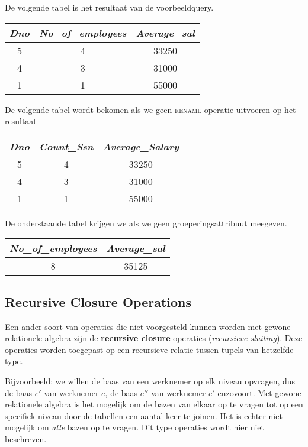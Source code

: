 \noindent De volgende tabel is het resultaat van de voorbeeldquery.
\begin{center}
\begin{tabular}{|c|c|c|}
\hline
\textit{Dno} & \textit{No\_of\_employees} & \textit{Average\_sal} \\ \hline
5 & 4 & 33250\\ \hline
4 & 3 & 31000\\ \hline
1 & 1 & 55000\\
\hline
\end{tabular}
\end{center}
\vspace{4mm}
De volgende tabel wordt bekomen als we geen \textsc{rename}-operatie uitvoeren op het resultaat
\begin{center}
\begin{tabular}{|c|c|c|}
\hline
\textit{Dno} & \textit{Count\_Ssn} & \textit{Average\_Salary} \\ \hline
5 & 4 & 33250\\ \hline
4 & 3 & 31000\\ \hline
1 & 1 & 55000\\
\hline
\end{tabular}
\end{center}
\vspace{4mm}
De onderstaande tabel krijgen we als we geen groeperingsattribuut meegeven.
\begin{center}
\begin{tabular}{|c|c|}
\hline
\textit{No\_of\_employees} & \textit{Average\_sal} \\ \hline
8 & 35125\\
\hline
\end{tabular}
\end{center}


\subsection{Recursive Closure Operations}
Een ander soort van operaties die niet voorgesteld kunnen worden met gewone relationele algebra zijn de \textbf{recursive closure}-operaties (\textit{recursieve sluiting}). Deze operaties worden toegepast op een recursieve relatie tussen tupels van hetzelfde type.

Bijvoorbeeld: we willen de baas van een werknemer op elk niveau opvragen, dus de baas $e'$ van werknemer $e$, de baas $e''$ van werknemer $e'$ enzovoort. Met gewone relationele algebra is het mogelijk om de bazen van elkaar op te vragen tot op een specifiek niveau door de tabellen een aantal keer te joinen. Het is echter niet mogelijk om \textit{alle} bazen op te vragen. Dit type operaties wordt hier niet beschreven.


